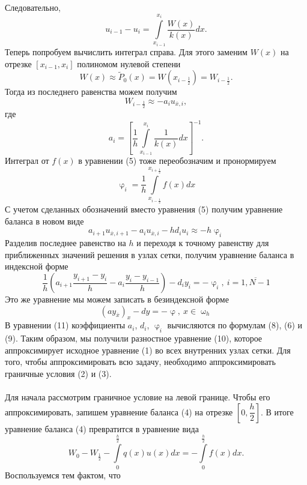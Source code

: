 \documentclass[a4paper, 12pt]{report}
\numberwithin{equation}{section}
\newcommand{\ol}{\overline}
\renewcommand{\varphi}{\upvarphi}
\renewcommand{\omega}{\upomega}
\begin{document}
	Следовательно,
	$$u_{i-1}-u_i = \int\limits_{x_{i-1}}^{x_i} \dfrac{W(x)}{k(x)}dx.$$
	Теперь попробуем вычислить интеграл справа. Для этого заменим $W(x)$ на отрезке $[x_{i-1}, x_i]$ полиномом нулевой степени
	$$W(x) \approx \widetilde P_0(x) = W(x_{i-\frac12}) = W_{i-\frac12}.$$
	Тогда из последнего равенства можем получим
	\begin{equation}
		W_{i-\frac12} \approx -a_i u_{\ol x, i},
	\end{equation}
	где \begin{equation}
		a_i = \left[ \dfrac 1h \int\limits_{x_{i-1}}^{x_i} \dfrac{1}{k(x)}dx\right]^{-1}.
	\end{equation}
	Интеграл от $f(x)$ в уравнении (5) тоже переобозначим и пронормируем
	\begin{equation}
		\varphi_i = \dfrac{1}{h} \int\limits_{x_{i-\frac12}}^{x_{i+\frac12}}f(x)dx
	\end{equation}
	С учетом сделанных обозначений вместо уравнения (5) получим уравнение баланса в новом виде
	$$a_{i+1}u_{\overline x, i+1} - a_i u_{\ol x, i} - h d_i u_i\approx -h \varphi_i$$
	Разделив последнее равенство на $h$ и переходя к точному равенству для приближенных значений решения в узлах сетки, получим уравнение баланса в индексной форме
	\begin{equation}
		\dfrac{1}{h}\left(a_{i+1}\dfrac{y_{i+1} - y_i}{h} - a_i \dfrac{y_i - y_{i-1}}{h}\right)-d_iy_i = -\varphi_i,\ i=\overline {1,N-1}
	\end{equation}
	Это же уравнение мы можем записать в безиндексной форме
	\begin{equation}
		(a y_{\ol x})_x - dy = -\varphi,\ x \in \omega_h
	\end{equation}
	В уравнении (11) коэффициенты $a_i$, $d_i$, $\varphi_i$ вычисляются по формулам (8), (6) и (9). Таким образом, мы получили разностное уравнение (10), которое аппроксимирует исходное уравнение (1) во всех внутренних узлах сетки. Для того, чтобы аппроксимировать всю задачу, необходимо аппроксимировать граничные условия (2) и (3).\\\\
	Для начала рассмотрим граничное условие на левой границе. Чтобы его аппроксимировать, запишем уравнение баланса (4) на отрезке $\left[0, \dfrac h2 \right]$. В итоге уравнение баланса (4) превратится в уравнение вида
	\begin{equation}
		W_0 - W_{\frac12} -\int\limits_{0}^{\frac h2} q(x)u(x)dx = -\int\limits_{0}^{\frac h2} f(x) dx.
	\end{equation} 
	Воспользуемся тем фактом, что
\end{document}
